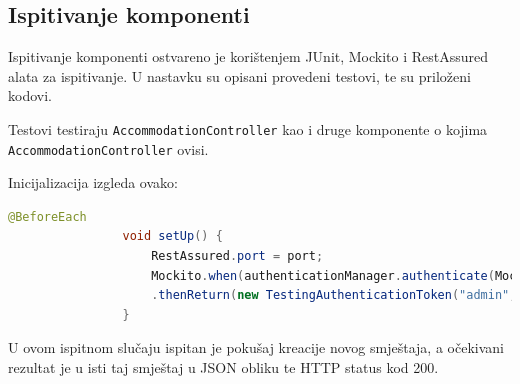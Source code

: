 			
			\subsection{Ispitivanje komponenti}
			
			Ispitivanje komponenti ostvareno je korištenjem JUnit, Mockito i RestAssured alata za ispitivanje. U nastavku su opisani provedeni testovi, te su priloženi kodovi.
			
			Testovi testiraju \texttt{AccommodationController} kao i druge komponente o kojima \texttt{AccommodationController} ovisi.
			
			Inicijalizacija izgleda ovako:
			
			\begin{lstlisting}[language=Java]
				@BeforeEach
				void setUp() {
					RestAssured.port = port;
					Mockito.when(authenticationManager.authenticate(Mockito.any()))
					.thenReturn(new TestingAuthenticationToken("admin", "password", "ACCOMMODATION", "TRANSPORT", "PATIENT"));
				}
			\end{lstlisting}
			
			U ovom ispitnom slučaju ispitan je pokušaj kreacije novog smještaja, a očekivani rezultat je u isti taj smještaj u JSON obliku te HTTP status kod 200.
			
